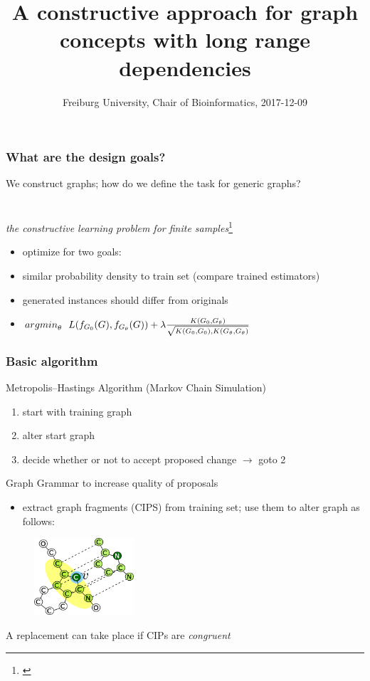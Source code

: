 \documentclass{beamer}
\title 
{A constructive approach for graph concepts
with long range dependencies}
\author %
{\underline{Stefan Mautner} \and Fabrizio Costa
    \href{mailto:mautner@informatik.uni-freiburg.de}
        {mautner@informatik.uni-freiburg.de} 
    \href{mailto:costa@informatik.uni-freiburg.de}
        {costa@informatik.uni-freiburg.de}
}
\date 
{Freiburg University, Chair of Bioinformatics, 2017-12-09}
\begin{document}
\frame{\titlepage}



\begin{frame}
\frametitle{What are the design goals?}

    We construct graphs; how do we define the task for generic graphs?
    ~\\
    ~\\
    ~\\
    \emph{the constructive learning problem for finite samples}\footnote{\cite{costa16}}
    ~\\
    \begin{itemize}
        \item optimize for two goals:
        \item similar probability density to train set (compare trained estimators)
        \item generated instances should  differ from originals
        \item ${argmin}_{\theta}~~L(f_{G_0}(G),f_{G_{\theta}}(G))+
            \lambda{{K(G_0,G_{\theta})}\over{\sqrt{K(G_0,G_0),K(G_{\theta},G_{\theta})}}} $
    \end{itemize}
\end{frame}


\begin{frame}
    \frametitle{Basic algorithm}
    Metropolis--Hastings Algorithm (Markov Chain Simulation)
    \begin{enumerate}
        \item start with training graph
        \item alter start graph
        \item decide whether or not to accept proposed change $\rightarrow$ goto 2
    \end{enumerate}
    \pause
    Graph Grammar to increase quality of proposals
    \begin{itemize}
        \item extract graph fragments (CIPS) from training set;
            use them to alter graph as follows:
    \end{itemize}
    \begin{figure}[ht]
        \centering
        \includegraphics[width=0.33\textwidth]{images/CIP_replacement.png}
    \end{figure}
    \small{A replacement can take place if CIPs are \emph{congruent}  }
\end{frame}
\end{document}
